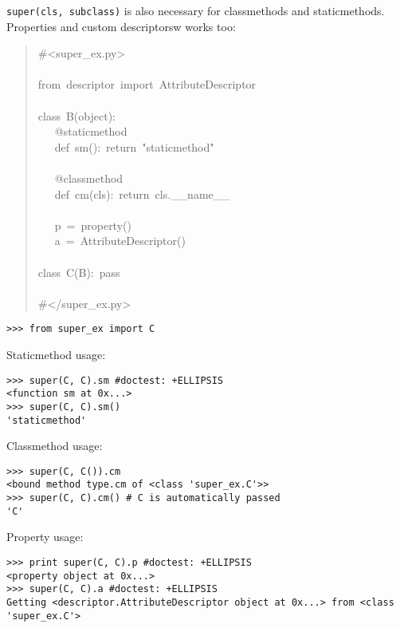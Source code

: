 \documentclass[10pt,a4paper,english]{article}
\begin{document}
\texttt{super(cls, subclass)} is also necessary for classmethods and staticmethods. 
Properties and custom descriptorsw works too:
\begin{quote}{\ttfamily \raggedright \noindent
{\#}<super{\_}ex.py>~\\
~\\
from~descriptor~import~AttributeDescriptor~\\
~\\
class~B(object):~\\
~~~@staticmethod~\\
~~~def~sm():~return~"staticmethod"~\\
~\\
~~~@classmethod~\\
~~~def~cm(cls):~return~cls.{\_}{\_}name{\_}{\_}~\\
~\\
~~~p~=~property()~\\
~~~a~=~AttributeDescriptor()~\\
~\\
class~C(B):~pass~\\
~\\
{\#}</super{\_}ex.py>
}\end{quote}
\begin{verbatim}>>> from super_ex import C\end{verbatim}

Staticmethod usage:
\begin{verbatim}>>> super(C, C).sm #doctest: +ELLIPSIS
<function sm at 0x...>
>>> super(C, C).sm()
'staticmethod'\end{verbatim}

Classmethod usage:
\begin{verbatim}>>> super(C, C()).cm
<bound method type.cm of <class 'super_ex.C'>>
>>> super(C, C).cm() # C is automatically passed
'C'\end{verbatim}

Property usage:
\begin{verbatim}>>> print super(C, C).p #doctest: +ELLIPSIS
<property object at 0x...>
>>> super(C, C).a #doctest: +ELLIPSIS
Getting <descriptor.AttributeDescriptor object at 0x...> from <class 'super_ex.C'>\end{verbatim}
\end{document}

